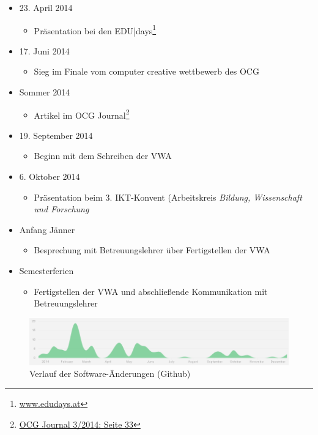 \documentclass[12pt,a4paper,oneside,DIV=14]{scrartcl}
\begin{document}
\begin{multicols}{2}
\begin{itemize}
	\item 23. April 2014
	\begin{itemize}
		\item Präsentation bei den \textsf{EDU|days}\footnote{\href{http://www.edudays.at/}{www.edudays.at}}
	\end{itemize}
	\item 17. Juni 2014
	\begin{itemize}
		\item Sieg im Finale vom \textsf{computer creative wettbewerb} des OCG
	\end{itemize}
	\item Sommer 2014
	\begin{itemize}
		\item Artikel im OCG Journal\footnote{\href{http://www.ocg.at/sites/ocg.at/files/medien/pdfs/OCG-Journal1403.pdf}{OCG Journal 3/2014: Seite 33}}
	\end{itemize}
	\item 19. September 2014
	\begin{itemize}
		\item Beginn mit dem Schreiben der VWA
	\end{itemize}
	\item 6. Oktober 2014
	\begin{itemize}
		\item Präsentation beim 3. IKT-Konvent (Arbeitskreis \emph{Bildung, Wissenschaft und Forschung}
	\end{itemize}
	\item Anfang Jänner
	\begin{itemize}
		\item Besprechung mit Betreuungslehrer über Fertigstellen der VWA
	\end{itemize}
	\item Semesterferien
	\begin{itemize}
		\item Fertigstellen der VWA und abschließende Kommunikation mit Betreuungslehrer
	\end{itemize}		
\end{itemize}
\end{multicols}
\begin{figure}[h]
  \centering
     \includegraphics[width=\textwidth]{figures/github_verlauf}
  \caption*{Verlauf der Software-Änderungen (Github)}
  \label{fig:github}
\end{figure}
\end{document}

